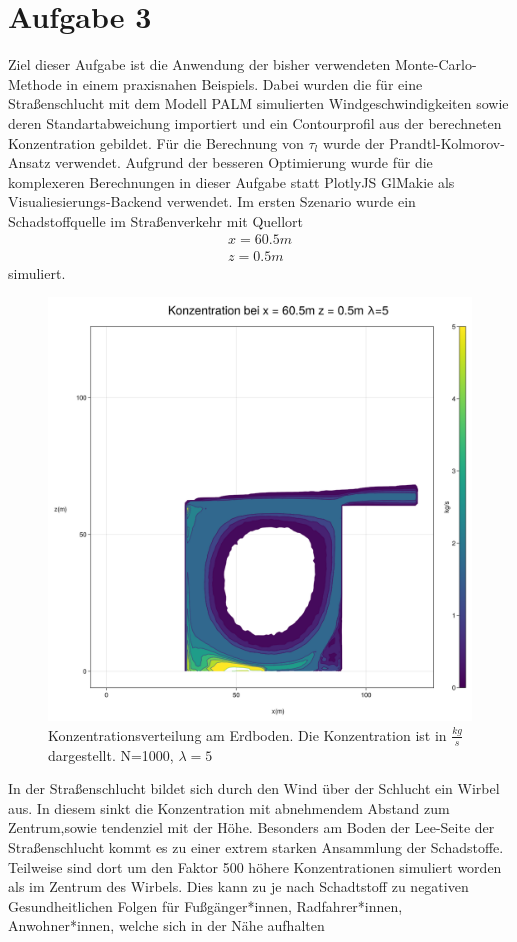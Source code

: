 \documentclass[ngerman]{scrartcl}
\begin{document}
\section{Aufgabe  3}
Ziel dieser Aufgabe ist die Anwendung der bisher verwendeten Monte-Carlo-Methode in einem praxisnahen Beispiels. Dabei wurden die für eine Straßenschlucht mit dem Modell PALM simulierten Windgeschwindigkeiten sowie deren Standartabweichung importiert und ein Contourprofil aus der berechneten Konzentration gebildet. Für die Berechnung von $\tau_l$ wurde der Prandtl-Kolmorov-Ansatz verwendet. Aufgrund der besseren Optimierung wurde für die komplexeren Berechnungen in dieser Aufgabe statt PlotlyJS  GlMakie als Visualiesierungs-Backend verwendet.
Im ersten Szenario wurde ein Schadstoffquelle im Straßenverkehr mit Quellort 
\begin{align}
	x=60.5 \si{m} \\
	z= 0.5 \si{m} 
\end{align}
simuliert.
\begin{figure}[H]
	\centering
	\includegraphics[scale=0.25]{Bilder/3_single_x = 60.5.png}
	\caption{Konzentrationsverteilung am Erdboden. Die Konzentration ist in $\frac{\si{kg}}{\si{s}}$ dargestellt. N=1000, $\lambda =5$}
	\label{fig:my_label}
\end{figure}
In der Straßenschlucht bildet sich durch den Wind über der Schlucht ein Wirbel aus. In diesem sinkt die Konzentration mit abnehmendem Abstand zum Zentrum,sowie tendenziel mit der Höhe. Besonders am Boden der Lee-Seite der Straßenschlucht kommt es zu einer extrem starken Ansammlung der Schadstoffe. Teilweise sind dort um den Faktor 500 höhere Konzentrationen simuliert worden als im Zentrum des Wirbels. Dies kann zu je nach Schadtstoff zu negativen Gesundheitlichen Folgen für Fußgänger*innen, Radfahrer*innen, Anwohner*innen, welche sich in der Nähe aufhalten
\end{document}
